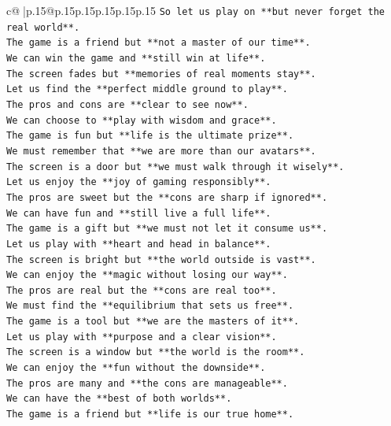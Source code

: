 \documentclass{article}
\begin{document}
{\begin{supertabular}{c@{$\;$}|p{.15\linewidth}@{}p{.15\linewidth}p{.15\linewidth}p{.15\linewidth}p{.15\linewidth}p{.15\linewidth}}
{{{\texttt{So let us play on **but never forget the real world**.} \\
\texttt{The game is a friend but **not a master of our time**.} \\
\texttt{We can win the game and **still win at life**.} \\
\texttt{The screen fades but **memories of real moments stay**.} \\
\texttt{Let us find the **perfect middle ground to play**.} \\
\texttt{The pros and cons are **clear to see now**.} \\
\texttt{We can choose to **play with wisdom and grace**.} \\
\texttt{The game is fun but **life is the ultimate prize**.} \\
\texttt{We must remember that **we are more than our avatars**.} \\
\texttt{The screen is a door but **we must walk through it wisely**.} \\
\texttt{Let us enjoy the **joy of gaming responsibly**.} \\
\texttt{The pros are sweet but the **cons are sharp if ignored**.} \\
\texttt{We can have fun and **still live a full life**.} \\
\texttt{The game is a gift but **we must not let it consume us**.} \\
\texttt{Let us play with **heart and head in balance**.} \\
\texttt{The screen is bright but **the world outside is vast**.} \\
\texttt{We can enjoy the **magic without losing our way**.} \\
\texttt{The pros are real but the **cons are real too**.} \\
\texttt{We must find the **equilibrium that sets us free**.} \\
\texttt{The game is a tool but **we are the masters of it**.} \\
\texttt{Let us play with **purpose and a clear vision**.} \\
\texttt{The screen is a window but **the world is the room**.} \\
\texttt{We can enjoy the **fun without the downside**.} \\
\texttt{The pros are many and **the cons are manageable**.} \\
\texttt{We can have the **best of both worlds**.} \\
\texttt{The game is a friend but **life is our true home**.} \\
}}}
\end{supertabular}}
\end{document}
